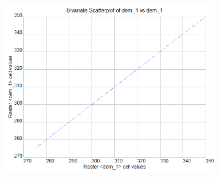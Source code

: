 \documentclass{sigchi}
\begin{document}
\begin{figure}
\begin{minipage}[t]{0.33\textwidth}
\begin{subfigure}{\linewidth}
            \caption{}~\label{fig:diff}
        \end{subfigure}\\
        \begin{subfigure}{\linewidth}
            \centering
            \includegraphics[width=\textwidth]{figures/reference/bivariate_1.png}%
            \caption{}~\label{fig:bivar}
        \end{subfigure}\\
        \vspace{1.25em}
        \captionsetup{width=.9\linewidth}
        \caption{\textbf{Reference model:} \\
        (a) the digital elevation model (DEM), \\
        (b) the difference between the reference DEM and the reference DEM, and \\
        (c) the bivariate scatterplot of the difference between the reference DEM and the reference DEM. %
        }~\label{fig:reference}
    \end{minipage}
%
    \begin{minipage}[t]{0.33\textwidth}
        \begin{subfigure}{\linewidth}
            \centering

\end{subfigure}
\end{minipage}
\end{figure}
\end{document}
